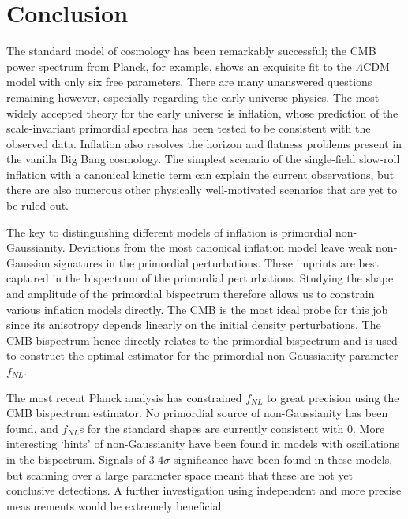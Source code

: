\chapter{Conclusion}

The standard model of cosmology has been remarkably successful; the CMB power spectrum from Planck, for example, shows an exquisite fit to the $\Lambda$CDM model with only six free parameters. There are many unanswered questions remaining however, especially regarding the early universe physics. The most widely accepted theory for the early universe is inflation, whose prediction of the scale-invariant primordial spectra has been tested to be consistent with the observed data. Inflation also resolves the horizon and flatness problems present in the vanilla Big Bang cosmology. The simplest scenario of the single-field slow-roll inflation with a canonical kinetic term can explain the current observations, but there are also numerous other physically well-motivated scenarios that are yet to be ruled out.

The key to distinguishing different models of inflation is primordial non-Gaussianity. Deviations from the most canonical inflation model leave weak non-Gaussian signatures in the primordial perturbations. These imprints are best captured in the bispectrum of the primordial perturbations. Studying the shape and amplitude of the primordial bispectrum therefore allows us to constrain various inflation models directly. The CMB is the most ideal probe for this job since its anisotropy depends linearly on the initial density perturbations. The CMB bispectrum hence directly relates to the primordial bispectrum and is used to construct the optimal estimator for the primordial non-Gaussianity parameter $f_{NL}$. 

The most recent Planck analysis has constrained $f_{NL}$ to great precision using the CMB bispectrum estimator. No primordial source of non-Gaussianity has been found, and $f_{NL}$s for the standard shapes are currently consistent with $0$. More interesting `hints' of non-Gaussianity have been found in models with oscillations in the bispectrum. Signals of $3$-$4\sigma$ significance have been found in these models, but scanning over a large parameter space meant that these are not yet conclusive detections. A further investigation using independent and more precise measurements would be extremely beneficial.

